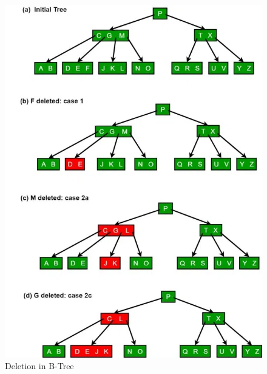 \documentclass{article}
\begin{document}
\begin{figure}[htp]
    \includegraphics[width=\textwidth]{bdelete.png}
    \caption{Deletion in B-Tree}
    \label{tab:placeholder}
\end{figure}
\end{document}
